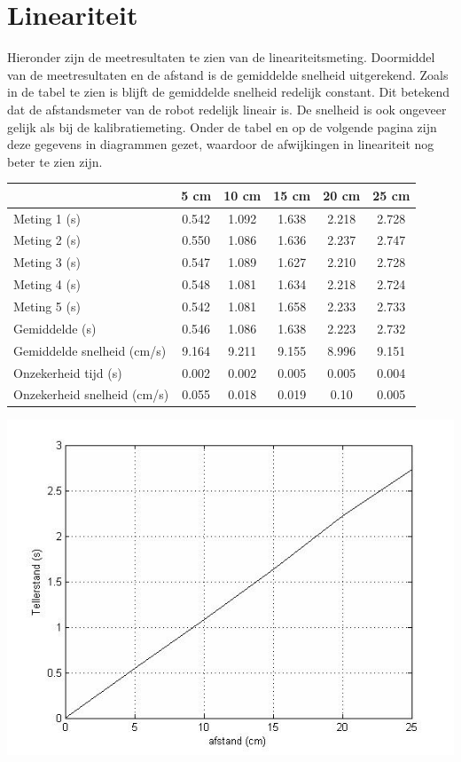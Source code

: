 \documentclass{report}
\begin{document}
\section{Lineariteit}
Hieronder zijn de meetresultaten te zien van de lineariteitsmeting. Doormiddel van de meetresultaten en de afstand is de gemiddelde snelheid uitgerekend. Zoals in de tabel te zien is blijft de gemiddelde snelheid redelijk constant. Dit betekend dat de afstandsmeter van de robot redelijk lineair is. De snelheid is ook ongeveer gelijk als bij de kalibratiemeting. Onder de tabel en op de volgende pagina zijn deze gegevens in diagrammen gezet, waardoor de afwijkingen in lineariteit nog beter te zien zijn. 
\begin{center}
\begin{tabular}{| l| c| c| c| c| c|}
\hline
   & 5 cm & 10 cm & 15 cm & 20 cm & 25 cm\\
\hline
   Meting 1 (s) & 0.542 & 1.092 & 1.638 & 2.218 & 2.728 \\
\hline
   Meting 2 (s) & 0.550 & 1.086 & 1.636 & 2.237 & 2.747 \\
\hline
   Meting 3 (s) & 0.547 & 1.089 & 1.627 & 2.210 & 2.728 \\
\hline
   Meting 4 (s) & 0.548 & 1.081 & 1.634 & 2.218 & 2.724 \\
\hline
   Meting 5 (s) & 0.542 & 1.081 & 1.658 & 2.233 & 2.733 \\
\hline
   Gemiddelde (s) & 0.546 & 1.086 & 1.638 & 2.223 & 2.732 \\
\hline
   Gemiddelde snelheid (cm/s) & 9.164 & 9.211 & 9.155 & 8.996 & 9.151 \\
\hline
   Onzekerheid tijd (s) & 0.002 & 0.002 & 0.005 & 0.005 & 0.004 \\
\hline
   Onzekerheid snelheid (cm/s) & 0.055 & 0.018 & 0.019 & 0.10 & 0.005 \\
\hline
 \end{tabular}
\end{center}
\begin{center}
\includegraphics[width=150mm] {afstand-tellerstand.jpg}
\end{center}
\end{document}
